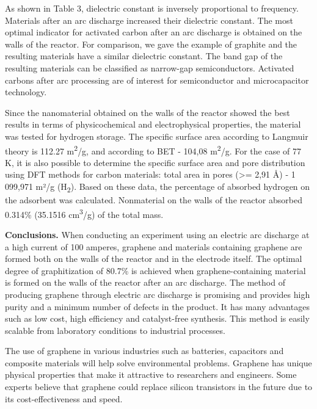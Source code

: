 \begin{multicols}{2}
As shown in Table 3, dielectric constant is inversely proportional to
frequency. Materials after an arc discharge increased their dielectric
constant. The most optimal indicator for activated carbon after an arc
discharge is obtained on the walls of the reactor. For comparison, we
gave the example of graphite and the resulting materials have a similar
dielectric constant. The band gap of the resulting materials can be
classified as narrow-gap semiconductors. Activated carbons after arc
processing are of interest for semiconductor and microcapacitor
technology.

Since the nanomaterial obtained on the walls of the reactor showed the
best results in terms of physicochemical and electrophysical properties,
the material was tested for hydrogen storage. The specific surface area
according to Langmuir theory is 112.27 m\textsuperscript{2}/g, and
according to BET - 104,08 m\textsuperscript{2}/g. For the case of 77 K,
it is also possible to determine the specific surface area and pore
distribution using DFT methods for carbon materials: total area in pores
(\textgreater= 2,91 Å) - 1 099,971 m²/g (H\textsubscript{2}). Based on
these data, the percentage of absorbed hydrogen on the adsorbent was
calculated. Nonmaterial on the walls of the reactor absorbed 0.314\%
(35.1516 cm\textsuperscript{3}/g) of the total mass.

{\bfseries Conclusions.} When conducting an experiment using an electric
arc discharge at a high current of 100 amperes, graphene and materials
containing graphene are formed both on the walls of the reactor and in
the electrode itself. The optimal degree of graphitization of 80.7\% is
achieved when graphene-containing material is formed on the walls of the
reactor after an arc discharge. The method of producing graphene through
electric arc discharge is promising and provides high purity and a
minimum number of defects in the product. It has many advantages such as
low cost, high efficiency and catalyst-free synthesis. This method is
easily scalable from laboratory conditions to industrial processes.

The use of graphene in various industries such as batteries, capacitors
and composite materials will help solve environmental problems. Graphene
has unique physical properties that make it attractive to researchers
and engineers. Some experts believe that graphene could replace silicon
transistors in the future due to its cost-effectiveness and speed.


\end{multicols}
